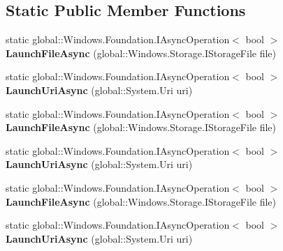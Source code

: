 \subsection*{Static Public Member Functions}
\begin{DoxyCompactItemize}
\item 
\mbox{\label{class_windows_1_1_system_1_1_launcher_afc03eb992a1f6a4ff9af2bf7eef6445f}} 
static global\+::\+Windows.\+Foundation.\+I\+Async\+Operation$<$ bool $>$ {\bfseries Launch\+File\+Async} (global\+::\+Windows.\+Storage.\+I\+Storage\+File file)
\item 
\mbox{\label{class_windows_1_1_system_1_1_launcher_ac4df25b2ed71d3f99b6202d36e78bbcd}} 
static global\+::\+Windows.\+Foundation.\+I\+Async\+Operation$<$ bool $>$ {\bfseries Launch\+Uri\+Async} (global\+::\+System.\+Uri uri)
\item 
\mbox{\label{class_windows_1_1_system_1_1_launcher_afc03eb992a1f6a4ff9af2bf7eef6445f}} 
static global\+::\+Windows.\+Foundation.\+I\+Async\+Operation$<$ bool $>$ {\bfseries Launch\+File\+Async} (global\+::\+Windows.\+Storage.\+I\+Storage\+File file)
\item 
\mbox{\label{class_windows_1_1_system_1_1_launcher_ac4df25b2ed71d3f99b6202d36e78bbcd}} 
static global\+::\+Windows.\+Foundation.\+I\+Async\+Operation$<$ bool $>$ {\bfseries Launch\+Uri\+Async} (global\+::\+System.\+Uri uri)
\item 
\mbox{\label{class_windows_1_1_system_1_1_launcher_afc03eb992a1f6a4ff9af2bf7eef6445f}} 
static global\+::\+Windows.\+Foundation.\+I\+Async\+Operation$<$ bool $>$ {\bfseries Launch\+File\+Async} (global\+::\+Windows.\+Storage.\+I\+Storage\+File file)
\item 
\mbox{\label{class_windows_1_1_system_1_1_launcher_ac4df25b2ed71d3f99b6202d36e78bbcd}} 
static global\+::\+Windows.\+Foundation.\+I\+Async\+Operation$<$ bool $>$ {\bfseries Launch\+Uri\+Async} (global\+::\+System.\+Uri uri)
\item 
\mbox{\label{class_windows_1_1_system_1_1_launcher_afc03eb992a1f6a4ff9af2bf7eef6445f}} 

\end{DoxyCompactItemize}
